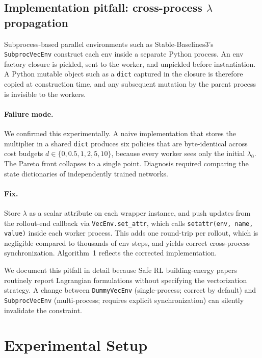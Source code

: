 \documentclass[11pt,a4paper]{article}
\begin{document}
\subsection{Implementation pitfall: cross-process $\lambda$ propagation}\label{sec:pitfall}

Subprocess-based parallel environments such as Stable-Baselines3's
\texttt{SubprocVecEnv} construct each env inside a separate Python
process. An env factory closure is pickled, sent to the worker, and
unpickled before instantiation. A Python mutable object such as a
\texttt{dict} captured in the closure is therefore copied at
construction time, and any subsequent mutation by the parent process
is invisible to the workers.

\paragraph{Failure mode.}
We confirmed this experimentally. A naive implementation that stores
the multiplier in a shared \texttt{dict} produces six policies that
are byte-identical across cost budgets $d\in\{0,0.5,1,2,5,10\}$,
because every worker sees only the initial $\lambda_0$. The Pareto
front collapses to a single point. Diagnosis required comparing the
state dictionaries of independently trained networks.

\paragraph{Fix.}
Store $\lambda$ as a scalar attribute on each wrapper instance, and
push updates from the rollout-end callback via
\texttt{VecEnv.set\_attr}, which calls
\texttt{setattr(env, name, value)} inside each worker process. This
adds one round-trip per rollout, which is negligible compared to
thousands of env steps, and yields correct cross-process
synchronization. Algorithm~1 reflects the corrected
implementation.

We document this pitfall in detail because Safe RL building-energy
papers routinely report Lagrangian formulations without specifying the
vectorization strategy. A change between \texttt{DummyVecEnv}
(single-process; correct by default) and \texttt{SubprocVecEnv}
(multi-process; requires explicit synchronization) can silently
invalidate the constraint.

\section{Experimental Setup}\label{sec:setup}
\end{document}
